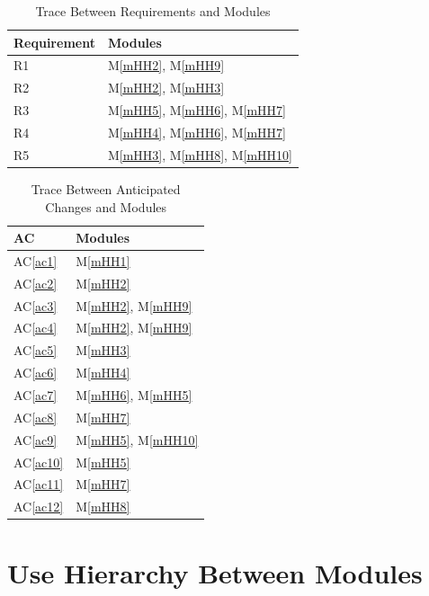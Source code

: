 \documentclass[12pt, titlepage]{article}
\newcommand{\acref}[1]{AC\ref{#1}}
\newcommand{\mref}[1]{M\ref{#1}}
\begin{document}
\begin{table}[H]
  \centering
  \begin{tabular}{p{} p{}}
  \toprule
  \textbf{Requirement} & \textbf{Modules} \\
  \midrule
  R1 & \mref{mHH2}, \mref{mHH9} \\
  R2 & \mref{mHH2}, \mref{mHH3} \\
  R3 & \mref{mHH5}, \mref{mHH6}, \mref{mHH7} \\
  R4 & \mref{mHH4}, \mref{mHH6}, \mref{mHH7} \\
  R5 & \mref{mHH3}, \mref{mHH8}, \mref{mHH10} \\
  \bottomrule
  \end{tabular}
  \caption{Trace Between Requirements and Modules}
  \label{TblRT}
  \end{table}
  

\begin{table}[H]
  \centering
  \begin{tabular}{p{} p{}}
  \toprule
  \textbf{AC} & \textbf{Modules}\\
  \midrule
  \acref{ac1} & \mref{mHH1}\\
  \acref{ac2} & \mref{mHH2}\\
  \acref{ac3} & \mref{mHH2}, \mref{mHH9}\\
  \acref{ac4} & \mref{mHH2}, \mref{mHH9}\\
  \acref{ac5} & \mref{mHH3}\\
  \acref{ac6} & \mref{mHH4}\\
  \acref{ac7} & \mref{mHH6}, \mref{mHH5}\\
  \acref{ac8} & \mref{mHH7}\\
  \acref{ac9} & \mref{mHH5}, \mref{mHH10}\\
  \acref{ac10} & \mref{mHH5}\\
  \acref{ac11} & \mref{mHH7}\\
  \acref{ac12} & \mref{mHH8}\\
  \bottomrule
  \end{tabular}
  \caption{Trace Between Anticipated Changes and Modules}
  \label{TblACT}
  \end{table}
  

\section{Use Hierarchy Between Modules} \label{SecUse}
\end{document}
